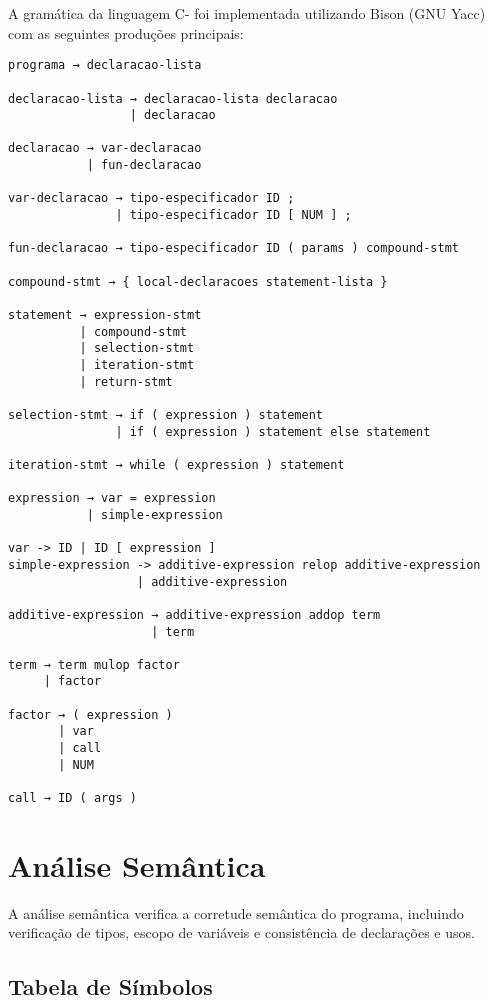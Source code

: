 \documentclass[
	12pt,				%
	oneside,
	a4paper,			%
	english,			%
	french,				%
	spanish,			%
	brazil,				%
	]{abntex2}
\begin{document}
A gramática da linguagem C- foi implementada utilizando Bison (GNU Yacc) com as seguintes produções principais:

\begin{lstlisting}[style=cstyle, caption=Gramática BNF da linguagem C-]
programa → declaracao-lista

declaracao-lista → declaracao-lista declaracao
                 | declaracao

declaracao → var-declaracao
           | fun-declaracao

var-declaracao → tipo-especificador ID ;
               | tipo-especificador ID [ NUM ] ;

fun-declaracao → tipo-especificador ID ( params ) compound-stmt

compound-stmt → { local-declaracoes statement-lista }

statement → expression-stmt
          | compound-stmt  
          | selection-stmt
          | iteration-stmt
          | return-stmt

selection-stmt → if ( expression ) statement
               | if ( expression ) statement else statement

iteration-stmt → while ( expression ) statement

expression → var = expression
           | simple-expression

var -> ID | ID [ expression ]
simple-expression -> additive-expression relop additive-expression
                  | additive-expression

additive-expression → additive-expression addop term
                    | term

term → term mulop factor
     | factor

factor → ( expression )
       | var
       | call
       | NUM

call → ID ( args )
\end{lstlisting}

\section{Análise Semântica}

A análise semântica verifica a corretude semântica do programa, incluindo verificação de tipos, escopo de variáveis e consistência de declarações e usos.

\subsection{Tabela de Símbolos}
\end{document}
